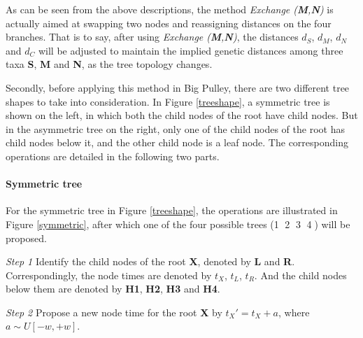 \documentclass{bmcart}
\begin{document}
As can be seen from the above descriptions, the method \textit{Exchange (\textbf{M},\textbf{N})} is actually aimed at swapping two nodes and reassigning distances on the four branches. That is to say, after using \textit{Exchange (\textbf{M},\textbf{N})}, the distances $d_S$, $d_{M}$, $d_{N}$ and $d_{C}$ will be adjusted to maintain the implied genetic distances among three taxa \textbf{S}, \textbf{M} and \textbf{N}, as the tree topology changes.

Secondly, before applying this method in Big Pulley, there are two different tree shapes to take into consideration. In Figure \ref{treeshape}, a symmetric tree is shown on the left, in which both the child nodes of the root have child nodes. But in the asymmetric tree on the right, only one of the child nodes of the root has child nodes below it, and the other child node is a leaf node. The corresponding operations are detailed in the following two parts.
\paragraph*{Symmetric tree}

For the symmetric tree in Figure \ref{treeshape}, the operations are illustrated in Figure \ref{symmetric}, after which one of the four possible trees (\textcircled1 \textcircled2 \textcircled3 \textcircled4) will be proposed.

\emph{Step 1} Identify the child nodes of the root \textbf{X}, denoted by \textbf{L} and \textbf{R}. Correspondingly, the node times are denoted by $t_X$, $t_L$, $t_R$. And the child nodes below them are denoted by \textbf{H1}, \textbf{H2}, \textbf{H3} and \textbf{H4}.

\emph{Step 2} Propose a new node time for the root \textbf{X} by ${t_X}' = {t_X} + a$, where $a \sim U[ - w, + w]$.
\end{document}
